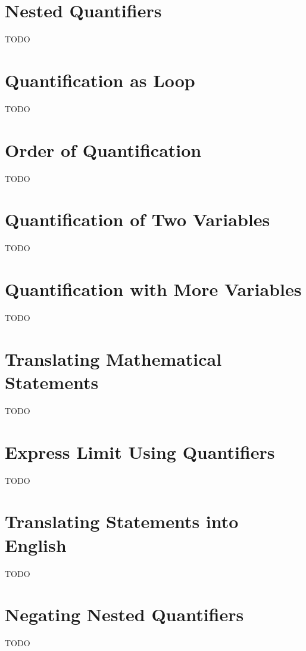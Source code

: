 \documentclass{article}
\begin{document}
\section{Nested Quantifiers}

TODO 

\section{Quantification as Loop}

TODO

\section{Order of Quantification}

TODO

\section{Quantification of Two Variables}

TODO

\section{Quantification with More Variables}

TODO

\section{Translating Mathematical Statements}

TODO

\section{Express Limit Using Quantifiers}

TODO

\section{Translating Statements into English}

TODO

\section{Negating Nested Quantifiers}

TODO
\end{document}

